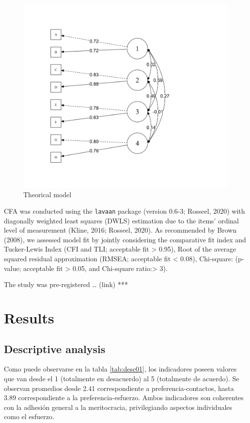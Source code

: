 \documentclass[
]{article}
\begin{document}
\begin{figure}[H]

{\centering \includegraphics[width=0.75\linewidth]{../output/images/meas01} 

}

\caption{Theorical model}\label{fig:meas01}
\end{figure}

CFA was conducted using the \texttt{lavaan} package (version 0.6-3; Rosseel, 2020) with diagonally weighted least squares (DWLS) estimation due to the items' ordinal level of measurement (Kline, 2016; Rosseel, 2020). As recommended by Brown (2008), we assessed model fit by jointly considering the comparative fit index and Tucker-Lewis Index (CFI and TLI; acceptable fit \textgreater{} 0.95), Root of the average squared residual approximation (RMSEA; acceptable fit \textless{} 0.08), Chi-square: (p-value; acceptable fit \textgreater{} 0.05, and Chi-square ratio:\textgreater{} 3).

The study was pre-registered \ldots{} (link) ***

\hypertarget{results}{%
\section{Results}\label{results}}

\hypertarget{descriptive-analysis}{%
\subsection{Descriptive analysis}\label{descriptive-analysis}}

Como puede observarse en la tabla \ref{tab:desc01}, los indicadores poseen valores que van desde el 1 (totalmente en desacuerdo) al 5 (totalmente de acuerdo). Se observan promedios desde 2.41 correspondiente a preferencia-contactos, hasta 3.89 correspondiente a la preferencia-esfuerzo. Ambos indicadores son coherentes con la adhesión general a la meritocracia, privilegiando aspectos individuales como el esfuerzo.
\end{document}
